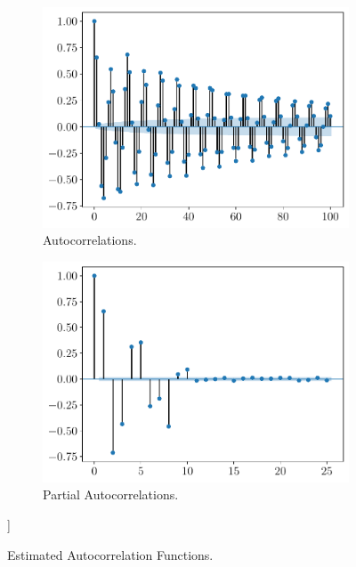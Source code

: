 \documentclass[fleqn]{article}
\begin{document}
\begin{figure}[H]
    \centering
    \begin{subfigure}[b]{0.45\textwidth}
        \centering
        \includegraphics[width=\textwidth]{figs/acf.pdf}
        \caption{Autocorrelations.}
        \label{fig:acf}
    \end{subfigure}
    \begin{subfigure}[b]{0.45\textwidth}  
        \centering 
        \includegraphics[width=\textwidth]{figs/pacf.pdf}
        \caption{Partial Autocorrelations.}
        \label{fig:pacf}
    \end{subfigure}]
    \caption{Estimated Autocorrelation Functions.}
    \label{fig:cf}
\end{figure}
\end{document}
